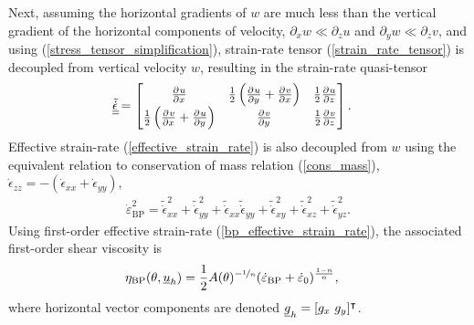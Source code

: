 Next, assuming the horizontal gradients of $w$ are much less than the vertical gradient of the horizontal components of velocity, \ie $\partial_x w \ll \partial_z u$ and $\partial_y w \ll \partial_z v$, and using (\ref{stress_tensor_simplification}), strain-rate tensor (\ref{strain_rate_tensor}) is decoupled from vertical velocity $w$, resulting in the strain-rate quasi-tensor
\begin{align}
  \label{bp_strain_rate_tensor}
  \tilde{\underline{\underline{\dot{\epsilon}}}}
  &= \begin{bmatrix}
       \frac{\partial^{} u}{\partial x^{} } & \frac{1}{2}\left( \frac{\partial^{} u}{\partial y^{} } + \frac{\partial^{} v}{\partial x^{} } \right) & \frac{1}{2} \frac{\partial^{} u}{\partial z^{} } \\
       \frac{1}{2}\left( \frac{\partial^{} v}{\partial x^{} } + \frac{\partial^{} u}{\partial y^{} } \right) & \frac{\partial^{} v}{\partial y^{} } & \frac{1}{2} \frac{\partial^{} v}{\partial z^{} } \\
     \end{bmatrix}.
\end{align}
Effective strain-rate (\ref{effective_strain_rate}) is also decoupled from $w$ using the equivalent relation to conservation of mass relation (\ref{cons_mass}), $\dot{\epsilon}_{zz} = -\left(\dot{\epsilon}_{xx} + \dot{\epsilon}_{yy} \right)$,
\begin{align}
  \label{bp_effective_strain_rate}
  \dot{\varepsilon}_{\text{BP}}^2 = \tilde{\dot{\epsilon}}_{xx}^2 + \tilde{\dot{\epsilon}}_{yy}^2 + \tilde{\dot{\epsilon}}_{xx} \tilde{\dot{\epsilon}}_{yy} + \tilde{\dot{\epsilon}}_{xy}^2 + \tilde{\dot{\epsilon}}_{xz}^2 + \tilde{\dot{\epsilon}}_{yz}^2.
\end{align}
Using first-order effective strain-rate (\ref{bp_effective_strain_rate}), the associated first-order shear viscosity is
\begin{align}
  \label{bp_viscosity}
  \eta_{\text{BP}}(\theta, \underline{u}_h) &= \frac{1}{2}A(\theta)^{-\nicefrac{1}{n}} (\dot{\varepsilon}_{\text{BP}} + \dot{\varepsilon}_0)^{\frac{1-n}{n}},
\end{align} 
where horizontal vector components are denoted $\rankone{g}_h = [g_x\ g_y]^\intercal$.

